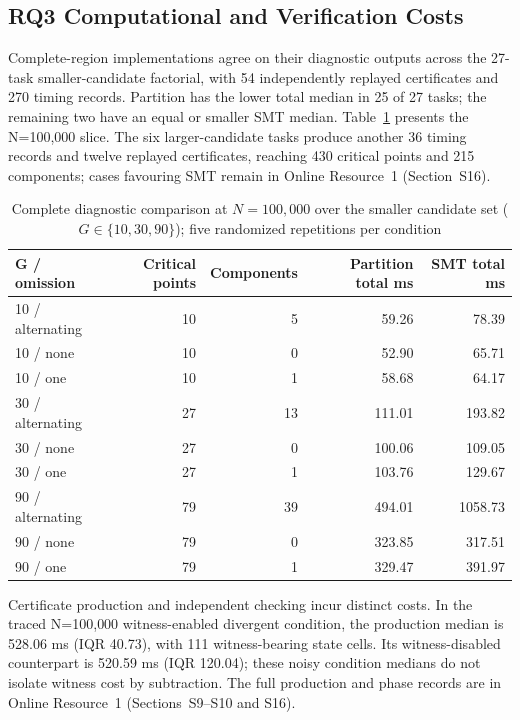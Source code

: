 \documentclass[11pt,a4paper]{article}
\begin{document}
\subsection{RQ3 Computational and Verification Costs}\label{subsec:rq3}

Complete-region implementations agree on their diagnostic outputs across the 27-task smaller-candidate factorial, with 54 independently replayed certificates and 270 timing records. Partition has the lower total median in 25 of 27 tasks; the remaining two have an equal or smaller SMT median. Table~\ref{tab:8} presents the N=100{,}000 slice. The six larger-candidate tasks produce another 36 timing records and twelve replayed certificates, reaching 430 critical points and 215 components; cases favouring SMT remain in Online Resource~1 (Section~S16).

\begin{table}[!htbp]
\caption{Complete diagnostic comparison at $N = 100{,}000$ over the smaller candidate set ($G \in \{10, 30, 90\}$); five randomized repetitions per condition}\label{tab:8}
\centering
\footnotesize
\setlength{\tabcolsep}{5pt}
\renewcommand{\arraystretch}{1.15}
\begin{tabular}{@{}lrrrr@{}}
\toprule
\textbf{G / omission} & \textbf{Critical points} & \textbf{Components} & \textbf{Partition total ms} & \textbf{SMT total ms} \\
\midrule
10 / alternating & 10 & 5 & 59.26 & 78.39 \\
10 / none & 10 & 0 & 52.90 & 65.71 \\
10 / one & 10 & 1 & 58.68 & 64.17 \\
30 / alternating & 27 & 13 & 111.01 & 193.82 \\
30 / none & 27 & 0 & 100.06 & 109.05 \\
30 / one & 27 & 1 & 103.76 & 129.67 \\
90 / alternating & 79 & 39 & 494.01 & 1058.73 \\
90 / none & 79 & 0 & 323.85 & 317.51 \\
90 / one & 79 & 1 & 329.47 & 391.97 \\
\bottomrule
\end{tabular}
\end{table}
\FloatBarrier

Certificate production and independent checking incur distinct costs. In the traced N=100{,}000 witness-enabled divergent condition, the production median is 528.06 ms (IQR 40.73), with 111 witness-bearing state cells. Its witness-disabled counterpart is 520.59 ms (IQR 120.04); these noisy condition medians do not isolate witness cost by subtraction. The full production and phase records are in Online Resource~1 (Sections~S9--S10 and S16).
\end{document}
